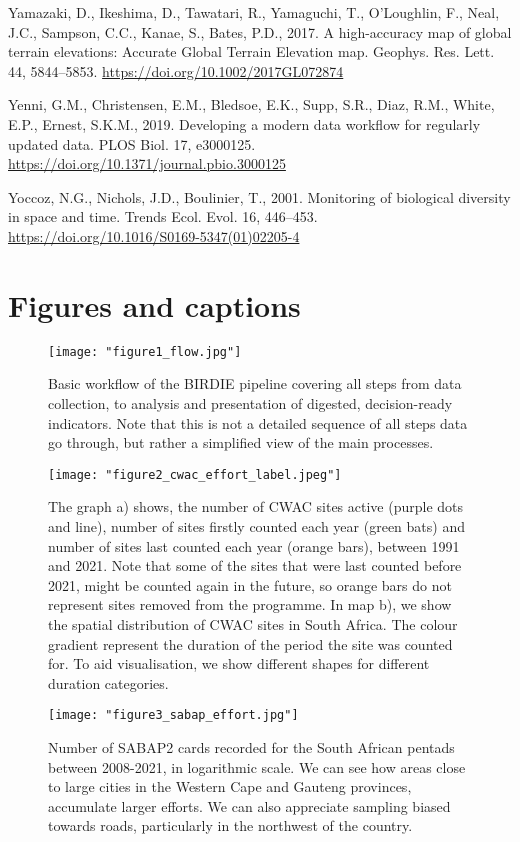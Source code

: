 \documentclass[utf8]{frontiersSCNS}
\begin{document}
Yamazaki, D., Ikeshima, D., Tawatari, R., Yamaguchi, T., O'Loughlin, F.,
Neal, J.C., Sampson, C.C., Kanae, S., Bates, P.D., 2017. A high-accuracy
map of global terrain elevations: Accurate Global Terrain Elevation map.
Geophys. Res. Lett. 44, 5844--5853.
\url{https://doi.org/10.1002/2017GL072874}

Yenni, G.M., Christensen, E.M., Bledsoe, E.K., Supp, S.R., Diaz, R.M.,
White, E.P., Ernest, S.K.M., 2019. Developing a modern data workflow for
regularly updated data. PLOS Biol. 17, e3000125.
\url{https://doi.org/10.1371/journal.pbio.3000125}

Yoccoz, N.G., Nichols, J.D., Boulinier, T., 2001. Monitoring of
biological diversity in space and time. Trends Ecol. Evol. 16, 446--453.
\url{https://doi.org/10.1016/S0169-5347(01)02205-4}

\hypertarget{figures-and-captions}{%
\section*{Figures and captions}\label{figures-and-captions}}

\begin{figure}[!h]
\centering
  \texttt{[image: "figure1\_flow.jpg"]}
  \caption{Basic workflow of the BIRDIE pipeline covering all steps from data collection, to analysis and presentation of digested, decision-ready indicators. Note that this is not a detailed sequence of all steps data go through, but rather a simplified view of the main processes.}
\end{figure}

\begin{figure}[!h]
\centering
  \texttt{[image: "figure2\_cwac\_effort\_label.jpeg"]}
  \caption{The graph a) shows, the number of CWAC sites active (purple dots and line), number of sites firstly counted each year (green bats) and number of sites last counted each year (orange bars), between 1991 and 2021. Note that some of the sites that were last counted before 2021, might be counted again in the future, so orange bars do not represent sites removed from the programme. In map b), we show the spatial distribution of CWAC sites in South Africa. The colour gradient represent the duration of the period the site was counted for. To aid visualisation, we show different shapes for different duration categories.}
\end{figure}

\begin{figure}[!h]
\centering
  \texttt{[image: "figure3\_sabap\_effort.jpg"]}
  \caption{Number of SABAP2 cards recorded for the South African pentads between 2008-2021, in logarithmic scale. We can see how areas close to large cities in the Western Cape and Gauteng provinces, accumulate larger efforts. We can also appreciate sampling biased towards roads, particularly in the northwest of the country.}
\end{figure}
\end{document}
